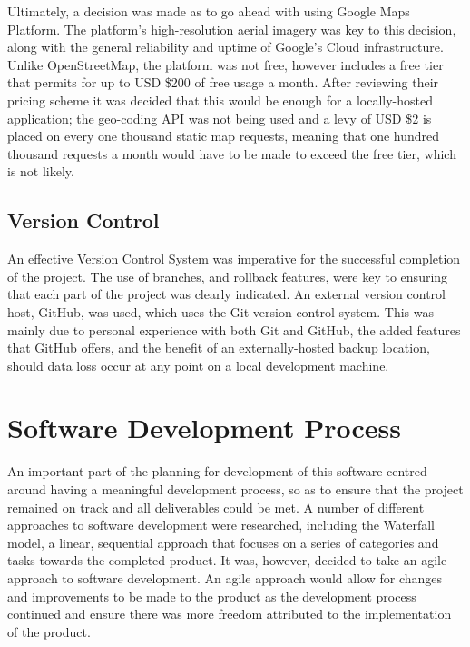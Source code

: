 Ultimately, a decision was made as to go ahead with using Google Maps Platform. The platform's high-resolution aerial imagery was key to this decision, along with the general reliability and uptime of Google's Cloud infrastructure. Unlike OpenStreetMap, the platform was not free, however includes a free tier that permits for up to USD \$200 of free usage a month. After reviewing their pricing scheme it was decided that this would be enough for a locally-hosted application; the geo-coding API was not being used and a levy of USD \$2 is placed on every one thousand static map requests, meaning that one hundred thousand requests a month would have to be made to exceed the free tier, which is not likely.

\subsection{Version Control}

An effective Version Control System was imperative for the successful completion of the project. The use of branches, and rollback features, were key to ensuring that each part of the project was clearly indicated. An external version control host, GitHub, was used, which uses the Git version control system. This was mainly due to personal experience with both Git and GitHub, the added features that GitHub offers, and the benefit of an externally-hosted backup location, should data loss occur at any point on a local development machine.

\section{Software Development Process}

An important part of the planning for development of this software centred around having a meaningful development process, so as to ensure that the project remained on track and all deliverables could be met. A number of different approaches to software development were researched, including the Waterfall model, a linear, sequential approach that focuses on a series of categories and tasks towards the completed product. It was, however, decided to take an agile approach to software development. An agile approach would allow for changes and improvements to be made to the product as the development process continued and ensure there was more freedom attributed to the implementation of the product.

